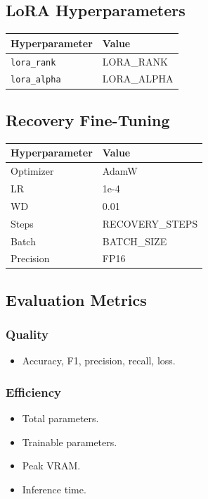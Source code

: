 \subsection{LoRA Hyperparameters}

\begin{table}[H]
\centering
\small
\begin{tabular}{ll}
\toprule
\textbf{Hyperparameter} & \textbf{Value} \\
\midrule
\texttt{lora\_rank} & {{LORA\_RANK}} \\
\texttt{lora\_alpha} & {{LORA\_ALPHA}} \\
\bottomrule
\end{tabular}
\end{table}

\subsection{Recovery Fine-Tuning}

\begin{table}[H]
\centering
\small
\begin{tabular}{ll}
\toprule
\textbf{Hyperparameter} & \textbf{Value} \\
\midrule
Optimizer & AdamW \\
LR & 1e-4 \\
WD & 0.01 \\
Steps & {{RECOVERY\_STEPS}} \\
Batch & {{BATCH\_SIZE}} \\
Precision & FP16 \\
\bottomrule
\end{tabular}
\end{table}

\subsection{Evaluation Metrics}

\subsubsection{Quality}
\begin{itemize}
\item Accuracy, F1, precision, recall, loss.

\end{itemize}
\subsubsection{Efficiency}
\begin{itemize}
\item Total parameters.
\item Trainable parameters.
\item Peak VRAM.
\item Inference time.

\end{itemize}
